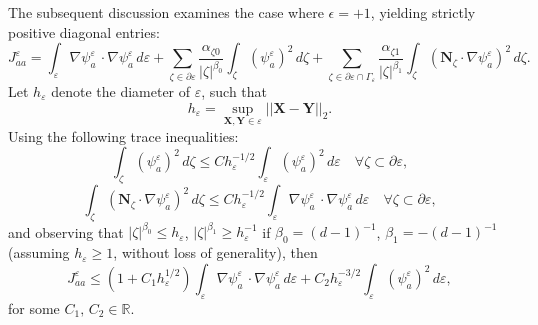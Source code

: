 The subsequent discussion examines the case where $\epsilon = +1$, yielding strictly positive diagonal entries:
\begin{equation}
	J^{\varepsilon}_{aa} = \int_{\varepsilon} \nabla \psi^{\varepsilon}_{a} \, \cdot \nabla \psi^{\varepsilon}_{a} \, d \varepsilon + \sum_{\zeta \in \partial \varepsilon} \frac{\alpha_{\zeta0}}{|\zeta|^{\beta_0}} \int_{\zeta} \left( \psi_a^{\varepsilon} \right)^2 \, d \zeta + \sum_{\zeta \in \partial \varepsilon \cap \Gamma_\varepsilon} \frac{\alpha_{\zeta1}}{|\zeta|^{\beta_1}} \int_{\zeta} \left( \mathbf{N}_{\zeta} \cdot \nabla \psi^{\varepsilon}_a \right)^2 \, d \zeta.
\end{equation}
Let $h_{\varepsilon}$ denote the diameter of $\varepsilon$, such that
\begin{equation}
	h_{\varepsilon} = \sup_{\mathbf{X}, \mathbf{Y} \in \varepsilon} ||\mathbf{X} - \mathbf{Y}||_2.
\end{equation}
Using the following trace inequalities:
\begin{equation}
	\int_{\zeta} \left( \psi_a^{\varepsilon} \right)^2 \, d \zeta \leq C h_\varepsilon^{-1/2} \int_{\varepsilon} \left( \psi_a^{\varepsilon} \right)^2 \, d \varepsilon \quad \forall \zeta \subset \partial \varepsilon,
\end{equation}
\begin{equation}
	\int_{\zeta} \left( \mathbf{N}_{\zeta} \cdot \nabla \psi^{\varepsilon}_a \right)^2 \, d \zeta \leq C h_\varepsilon^{-1/2} \int_{\varepsilon} \nabla \psi^{\varepsilon}_{a} \, \cdot \nabla \psi^{\varepsilon}_{a} \, d \varepsilon \quad \forall \zeta \subset \partial \varepsilon,
\end{equation}
and observing that $|\zeta|^{\beta_0} \leq h_\varepsilon$, $|\zeta|^{\beta_1} \geq h_\varepsilon^{-1}$ if $\beta_0 = (d-1)^{-1}$, $\beta_1 = -(d-1)^{-1}$ (assuming $h_\varepsilon \geq 1$, without loss of generality), then
\begin{equation}
	J^{\varepsilon}_{aa} \leq (1 + C_1 h_\varepsilon^{1/2}) \int_{\varepsilon} \nabla \psi^{\varepsilon}_{a} \, \cdot \nabla \psi^{\varepsilon}_{a} \, d \varepsilon + C_2 h_\varepsilon^{-3/2} \int_{\varepsilon} \left( \psi_a^{\varepsilon} \right)^2 \, d \varepsilon,
\end{equation}
for some $C_1, \, C_2 \in \mathbb{R}$.

